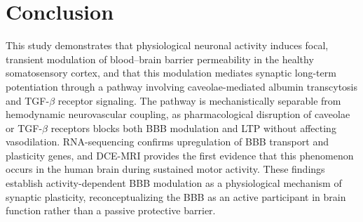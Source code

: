 \documentclass[11pt]{article}
\begin{document}
\section{Conclusion}

This study demonstrates that physiological neuronal activity induces focal, transient modulation of blood--brain barrier permeability in the healthy somatosensory cortex, and that this modulation mediates synaptic long-term potentiation through a pathway involving caveolae-mediated albumin transcytosis and TGF-$\beta$ receptor signaling. The pathway is mechanistically separable from hemodynamic neurovascular coupling, as pharmacological disruption of caveolae or TGF-$\beta$ receptors blocks both BBB modulation and LTP without affecting vasodilation. RNA-sequencing confirms upregulation of BBB transport and plasticity genes, and DCE-MRI provides the first evidence that this phenomenon occurs in the human brain during sustained motor activity. These findings establish activity-dependent BBB modulation as a physiological mechanism of synaptic plasticity, reconceptualizing the BBB as an active participant in brain function rather than a passive protective barrier.



\end{document}
